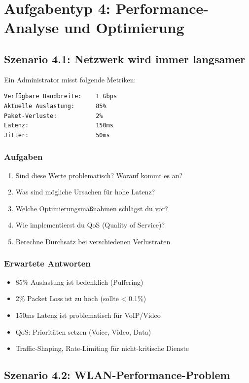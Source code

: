\documentclass[12pt,a4paper,german]{report}
\begin{document}
\chapter{Aufgabentyp 4: Performance-Analyse und Optimierung}

\section{Szenario 4.1: Netzwerk wird immer langsamer}

Ein Administrator misst folgende Metriken:
\begin{lstlisting}
Verfügbare Bandbreite:    1 Gbps
Aktuelle Auslastung:      85%
Paket-Verluste:           2%
Latenz:                   150ms
Jitter:                   50ms
\end{lstlisting}

\subsection{Aufgaben}
\begin{enumerate}
    \item Sind diese Werte problematisch? Worauf kommt es an?
    \item Was sind mögliche Ursachen für hohe Latenz?
    \item Welche Optimierungsmaßnahmen schlägst du vor?
    \item Wie implementierst du QoS (Quality of Service)?
    \item Berechne Durchsatz bei verschiedenen Verlustraten
\end{enumerate}

\subsection{Erwartete Antworten}
\begin{itemize}
    \item 85\% Auslastung ist bedenklich (Puffering)
    \item 2\% Packet Loss ist zu hoch (sollte < 0.1\%)
    \item 150ms Latenz ist problematisch für VoIP/Video
    \item QoS: Prioritäten setzen (Voice, Video, Data)
    \item Traffic-Shaping, Rate-Limiting für nicht-kritische Dienste
\end{itemize}

\section{Szenario 4.2: WLAN-Performance-Problem}
\end{document}
